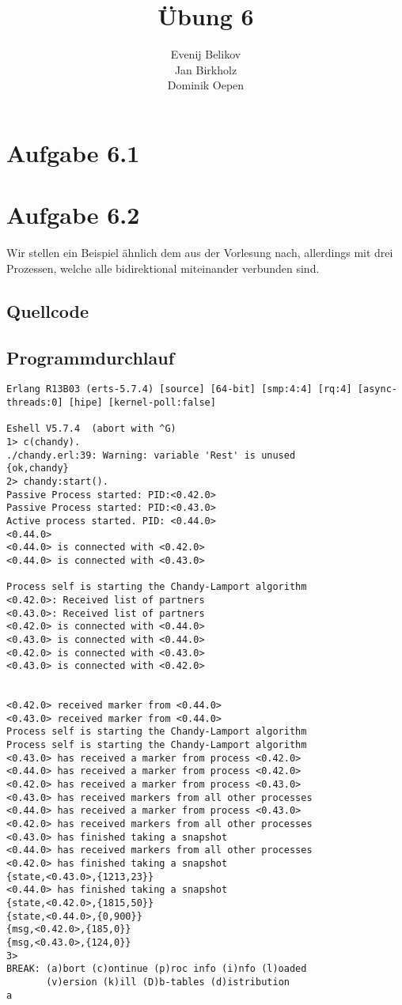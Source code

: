 \documentclass{scrartcl}
\begin{document}
\title{Übung 6}
\author{Evenij Belikov\\Jan Birkholz\\Dominik Oepen}
\maketitle

\section*{Aufgabe 6.1}

\section*{Aufgabe 6.2}
Wir stellen ein Beispiel ähnlich dem aus der Vorlesung nach, allerdings mit drei Prozessen,
welche alle bidirektional miteinander verbunden sind.

\subsection*{Quellcode}


\subsection*{Programmdurchlauf}
\begin{verbatim}
Erlang R13B03 (erts-5.7.4) [source] [64-bit] [smp:4:4] [rq:4] [async-threads:0] [hipe] [kernel-poll:false]

Eshell V5.7.4  (abort with ^G)
1> c(chandy).
./chandy.erl:39: Warning: variable 'Rest' is unused
{ok,chandy}
2> chandy:start().
Passive Process started: PID:<0.42.0>
Passive Process started: PID:<0.43.0>
Active process started. PID: <0.44.0>
<0.44.0>
<0.44.0> is connected with <0.42.0>
<0.44.0> is connected with <0.43.0>
   
Process self is starting the Chandy-Lamport algorithm
<0.42.0>: Received list of partners
<0.43.0>: Received list of partners
<0.42.0> is connected with <0.44.0>
<0.43.0> is connected with <0.44.0>
<0.42.0> is connected with <0.43.0>
<0.43.0> is connected with <0.42.0>
   
   
<0.42.0> received marker from <0.44.0>
<0.43.0> received marker from <0.44.0>
Process self is starting the Chandy-Lamport algorithm
Process self is starting the Chandy-Lamport algorithm
<0.43.0> has received a marker from process <0.42.0>
<0.44.0> has received a marker from process <0.42.0>
<0.42.0> has received a marker from process <0.43.0>
<0.43.0> has received markers from all other processes
<0.44.0> has received a marker from process <0.43.0>
<0.42.0> has received markers from all other processes
<0.43.0> has finished taking a snapshot
<0.44.0> has received markers from all other processes
<0.42.0> has finished taking a snapshot
{state,<0.43.0>,{1213,23}}
<0.44.0> has finished taking a snapshot
{state,<0.42.0>,{1815,50}}
{state,<0.44.0>,{0,900}}
{msg,<0.42.0>,{185,0}}
{msg,<0.43.0>,{124,0}}
3> 
BREAK: (a)bort (c)ontinue (p)roc info (i)nfo (l)oaded
       (v)ersion (k)ill (D)b-tables (d)istribution
a
\end{verbatim}
\end{document}
